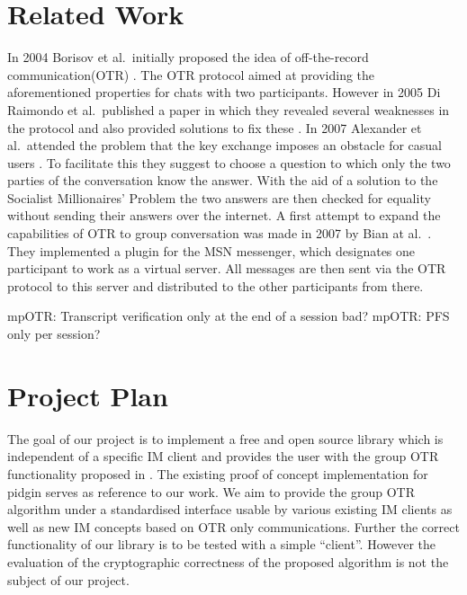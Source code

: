 \section{Related Work}

In 2004 Borisov et al.\ initially proposed the idea of off-the-record
communication(OTR) \cite{otr}. The OTR protocol aimed at providing the
aforementioned properties for chats with two participants. However in 2005 Di
Raimondo et al.\ published a paper in which they revealed several weaknesses in
the protocol and also provided solutions to fix these \cite{sec-otr}. In 2007
Alexander et al.\ attended the problem that the key exchange imposes an obstacle
for casual users \cite{auth-otr}. To facilitate this they suggest to choose a question to which
only the two parties of the conversation know the answer. With the aid of a solution
to the Socialist Millionaires’ Problem the two answers are then checked for equality without sending their answers over the internet.
A first attempt to expand the capabilities of OTR to group conversation was made in 2007 by Bian at al.\ \cite{gotr}. They implemented a plugin for the MSN messenger, which designates one participant to work as a virtual server. All messages are then sent via the OTR protocol to this server and distributed to the other participants from there.


mpOTR: Transcript verification only at the end of a session bad?
mpOTR: PFS only per session?

\section{Project Plan}

The goal of our project is to implement a free and open source library which is
independent of a specific IM client and provides the user with the group OTR
functionality proposed in \cite{impr-gotr}. The existing proof of concept
implementation for pidgin serves as reference to our work. We aim to provide the
group OTR algorithm under a standardised interface usable by various existing IM
clients as well as new IM concepts based on OTR only communications. Further the
correct functionality of our library is to be tested with a simple “client”.
However the evaluation of the cryptographic correctness of the proposed
algorithm is not the subject of our project.

